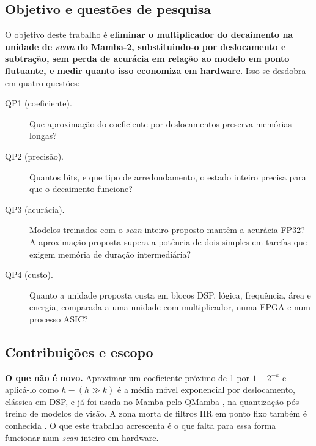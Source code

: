 \documentclass[12pt]{article}
\begin{document}
\subsection{Objetivo e questões de pesquisa}
O objetivo deste trabalho é \textbf{eliminar o multiplicador do decaimento na unidade de \emph{scan} do Mamba-2, substituindo-o por deslocamento e subtração, sem perda de acurácia em relação ao modelo em ponto flutuante, e medir quanto isso economiza em hardware}. Isso se desdobra em quatro questões:
\begin{description}
  \item[QP1 (coeficiente).] Que aproximação do coeficiente por deslocamentos preserva memórias longas?
  \item[QP2 (precisão).] Quantos bits, e que tipo de arredondamento, o estado inteiro precisa para que o decaimento funcione?
  \item[QP3 (acurácia).] Modelos treinados com o \emph{scan} inteiro proposto mantêm a acurácia FP32? A aproximação proposta supera a potência de dois simples em tarefas que exigem memória de duração intermediária?
  \item[QP4 (custo).] Quanto a unidade proposta custa em blocos DSP, lógica, frequência, área e energia, comparada a uma unidade com multiplicador, numa FPGA e num processo ASIC?
\end{description}

\subsection{Contribuições e escopo}
\textbf{O que não é novo.} Aproximar um coeficiente próximo de 1 por $1-2^{-k}$ e aplicá-lo como $h - (h \gg k)$ é a média móvel exponencial por deslocamento, clássica em DSP, e já foi usada no Mamba pelo QMamba \cite{li2025qmamba}, na quantização pós-treino de modelos de visão. A zona morta de filtros IIR em ponto fixo também é conhecida \cite{oppenheim2010dtsp}. O que este trabalho acrescenta é o que falta para essa forma funcionar num \emph{scan} inteiro em hardware.
\end{document}
